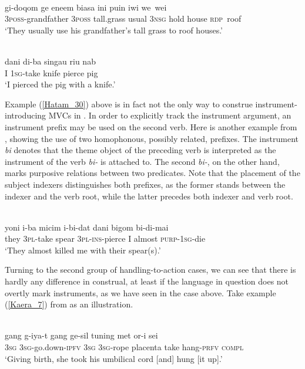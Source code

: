 \ea \label{Klon_87}
\\
\gll gi-doqom ge eneem biasa ini puin iwi we~wei\\
3\textsc{poss}-grandfather 3\textsc{poss} tall.grass usual 3\textsc{nsg} hold house \textsc{rdp}~roof\\
\glft `They usually use his grandfather's tall grass to roof houses.'\\ 
\z

\ea \label{Hatam_30}
\\
\gll dani di-ba singau riu nab \\
I 1\textsc{sg}-take knife pierce pig \\
\glft `I pierced the pig with a knife.'\\ 
\z

Example (\ref{Hatam_30}) above is in fact not the only way to construe instrument-in\-tro\-ducing MVCs in . In order to explicitly track the instrument argument, an instrument prefix may be used on the second verb. Here is another example from , showing the use of two homophonous, possibly related, prefixes. The instrument \textit{bi} denotes that the theme object of the preceding verb is interpreted as the instrument of the verb \textit{bi-} is attached to. The second \textit{bi-}, on the other hand, marks purposive relations between two predicates. Note that the placement of the subject indexers distinguishes both prefixes, as the former stands between the indexer and the verb root, while the latter precedes both indexer and verb root.

\ea 
{}\\
\gll yoni i-ba micim i-bi-dat dani bigom bi-di-mai \\
they 3\textsc{pl}-take spear 3\textsc{pl}-\textsc{ins}-pierce I almost \textsc{purp}-1\textsc{sg}-die \\
\glft `They almost killed me with their spear(s).'\\ 
\z

Turning to the second group of handling-to-action cases, we can see that there is hardly any difference in construal, at least if the language in question does not overtly mark instruments, as we have seen in the  case above. Take example (\ref{Kaera_7}) from  as an illustration.

\ea \label{Kaera_7}
\\
\gll gang g-iya-t gang ge-sil tuning met or-i sei \\
3\textsc{sg} 3\textsc{sg}-go.down-\textsc{ipfv} 3\textsc{sg} 3\textsc{sg}-rope placenta take hang-\textsc{prfv} \textsc{compl} \\
\glft `Giving birth, she took his umbilical cord [and] hung [it up].'\\ 
\z

